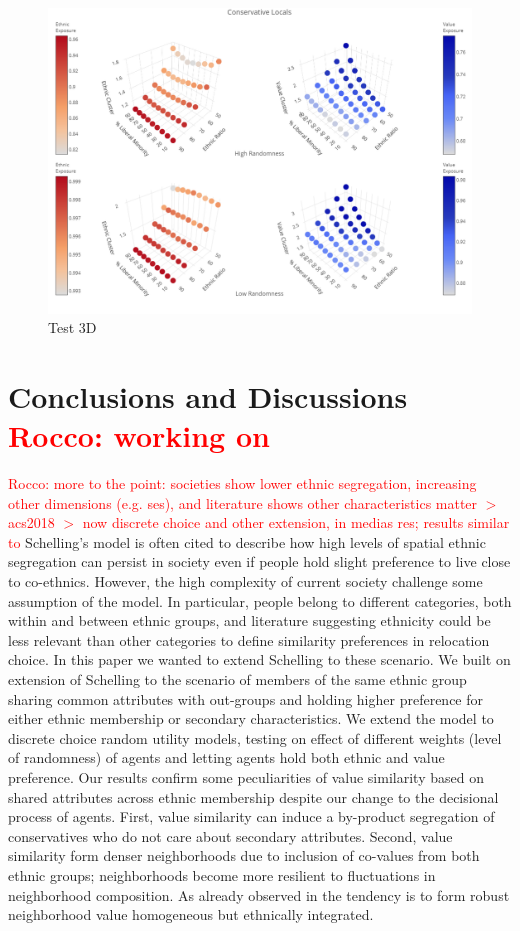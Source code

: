 \documentclass{article}
\newcommand{\rocco}[1]{{\textcolor{red}{Rocco: #1}}} %
\begin{document}
\begin{figure}[H]
    \centering
    \includegraphics[scale=0.3]{material/figures/newplot.jpg}
    \caption{Test 3D}
    \label{fig:et_libloc}
\end{figure} %


\section*{Conclusions and Discussions \rocco{working on} }

\rocco{more to the point: societies show lower ethnic segregation, increasing other dimensions (e.g. ses), and literature shows other characteristics matter $>$ acs2018 $>$ now discrete choice and other extension, in medias res; results similar to \textcite{paolillo2018}}
Schelling's model is often cited to describe how high levels of spatial ethnic segregation can persist in society even if people hold slight preference to live close to co-ethnics. However, the high complexity of current society challenge some assumption of  the model. In particular, people belong to different categories, both within and between ethnic groups, and literature suggesting ethnicity could be less relevant than other categories to define similarity preferences in relocation choice. In this paper we wanted to extend Schelling to these scenario. We built on \textcite{paolillo2018} extension of Schelling to the scenario of members of the same ethnic group sharing common attributes with out-groups and holding higher preference for either ethnic membership or secondary characteristics. We extend the model to discrete choice random utility models, testing on effect of different weights (level of randomness) of agents and letting agents hold both ethnic and value preference. Our results confirm some peculiarities of value similarity based on shared attributes across ethnic membership despite our change to the decisional process of agents.
First, value similarity can induce a by-product segregation of conservatives who do not care about secondary attributes. Second, value similarity form denser neighborhoods due to inclusion of co-values from both ethnic groups; neighborhoods become more resilient to fluctuations in neighborhood composition. As already observed in \textcite{paolillo2018} the tendency is to form robust neighborhood value homogeneous but ethnically integrated. 
\end{document}
